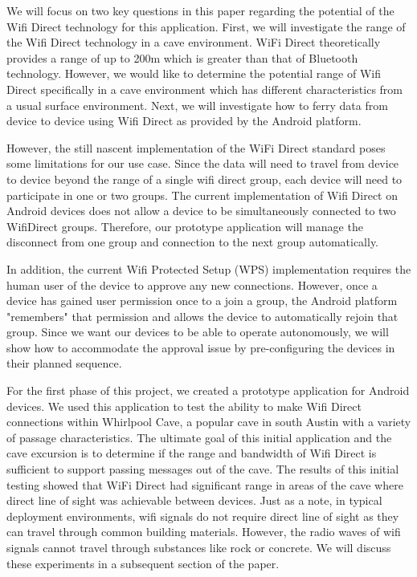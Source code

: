 \documentclass[10pt,twocolumn]{article}
\begin{document}
We will focus on two key questions in this paper regarding the potential of the Wifi Direct technology for this application.
First, we will investigate the range of the Wifi Direct technology in a cave environment.
WiFi Direct theoretically provides a range of up to 200m which is greater than that of Bluetooth technology. 
However, we would like to determine the potential range of Wifi Direct specifically in a cave environment which has different characteristics from a usual surface environment. 
Next, we will investigate how to ferry data from device to device using Wifi Direct as provided by the Android platform. 

However, the still nascent implementation of the WiFi Direct standard poses some limitations for our use case.
Since the data will need to travel from device to device beyond the range of a single wifi direct group, 
each device will need to participate in one or two groups. 
The current implementation of Wifi Direct on Android devices does not allow a device to be simultaneously connected to two WifiDirect groups.
Therefore, our prototype application will manage the disconnect from one group and connection to the next group automatically.

In addition, the current Wifi Protected Setup (WPS) implementation requires the human user of the device to approve any new connections.
However, once a device has gained user permission once to a join a group, the Android platform "remembers" that permission and allows the device to automatically rejoin that group.
Since we want our devices to be able to operate autonomously, we will show how to accommodate the approval issue by pre-configuring the devices in their planned sequence.
 
For the first phase of this project, we created a prototype application for Android devices. 
We used this application to test the ability to make Wifi Direct connections within Whirlpool Cave, a popular cave in south Austin with a variety of passage characteristics. 
The ultimate goal of this initial application and the cave excursion is to determine if the range and bandwidth of Wifi Direct is sufficient to support passing messages out of the cave.
The results of this initial testing showed that WiFi Direct had significant range in areas of the cave where direct line of sight was achievable between devices.
Just as a note, in typical deployment environments, wifi signals do not require direct line of sight as they can travel through common building materials.
However, the radio waves of wifi signals cannot travel through substances like rock or concrete.
We will discuss these experiments in a subsequent section of the paper.
\end{document}
